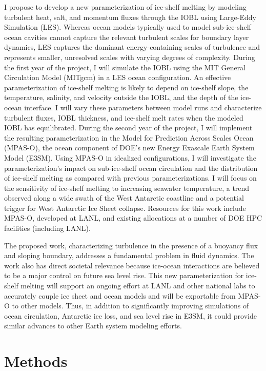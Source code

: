 \documentclass[draft]{styles/agujournal2019}
\begin{document}
I propose to develop a new parameterization of ice-shelf melting by modeling turbulent heat, salt, and momentum fluxes through the IOBL using Large-Eddy Simulation (LES). Whereas ocean models typically used to model sub-ice-shelf ocean cavities cannot capture the relevant turbulent scales for boundary layer dynamics, LES captures the dominant energy-containing scales of turbulence and represents smaller, unresolved scales with varying degrees of complexity. During the first year of the project, I will simulate the IOBL using the MIT General Circulation Model (MITgcm) in a LES ocean configuration. An effective parameterization of ice-shelf melting is likely to depend on ice-shelf slope, the temperature, salinity, and velocity outside the IOBL, and the depth of the ice-ocean interface. I will vary these parameters between model runs and characterize turbulent fluxes, IOBL thickness, and ice-shelf melt rates when the modeled IOBL has equilibrated.  During the second year of the project, I will implement the resulting parameterization in the Model for Prediction Across Scales Ocean (MPAS-O), the ocean component of DOE’s new Energy Exascale Earth System Model (E3SM). Using MPAS-O in idealized configurations, I will investigate the parameterization’s impact on sub-ice-shelf ocean circulation and the distribution of ice-shelf melting as compared with previous parameterizations. I will focus on the sensitivity of ice-shelf melting to increasing seawater temperature, a trend observed along a wide swath of the West Antarctic coastline and a potential trigger for West Antarctic Ice Sheet collapse. Resources for this work include MPAS-O, developed at LANL, and existing allocations at a number of DOE HPC facilities (including LANL). 

The proposed work, characterizing turbulence in the presence of a buoyancy flux and sloping boundary, addresses a fundamental problem in fluid dynamics. The work also has direct societal relevance because ice-ocean interactions are believed to be a major control on future sea level rise. This new parameterization for ice-shelf melting will support an ongoing effort at LANL and other national labs to accurately couple ice sheet and ocean models and will be exportable from MPAS-O to other models. Thus, in addition to significantly improving simulations of ocean circulation, Antarctic ice loss, and sea level rise in E3SM, it could provide similar advances to other Earth system modeling efforts. 

\section{Methods}
\end{document}
